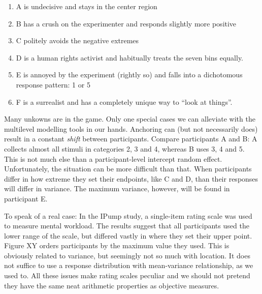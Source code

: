 \documentclass[]{svmono}
\providecommand{\tightlist}{%
  \setlength{\itemsep}{0pt}\setlength{\parskip}{0pt}}
\theoremstyle{definition}
\theoremstyle{definition}
\theoremstyle{definition}
\theoremstyle{remark}
\begin{document}
\begin{enumerate}
\def\labelenumi{\arabic{enumi}.}
\tightlist
\item
  A is undecisive and stays in the center region
\item
  B has a crush on the experimenter and responds slightly more positive
\item
  C politely avoids the negative extremes
\item
  D is a human rights activist and habitually treats the seven bins
  equally.
\item
  E is annoyed by the experiment (rightly so) and falls into a
  dichotomous response pattern: 1 or 5
\item
  F is a surrealist and has a completely unique way to ``look at
  things''.
\end{enumerate}

Many unkowns are in the game. Only one special cases we can alleviate
with the multilevel modelling tools in our hands. Anchoring can (but not
necessarily does) result in a constant \emph{shift} between
participants. Compare participants A and B: A collects almost all
stimuli in categories 2, 3 and 4, whereas B uses 3, 4 and 5. This is not
much else than a participant-level intercept random effect.
Unfortunately, the situation can be more difficult than that. When
participants differ in how extreme they set their endpoints, like C and
D, than their responses will differ in variance. The maximum variance,
however, will be found in participant E.

To speak of a real case: In the IPump study, a single-item rating scale
was used to measure mental workload. The results suggest that all
participants used the lower range of the scale, but differed vastly in
where they set their upper point. Figure XY orders participants by the
maximum value they used. This is obviously related to variance, but
seemingly not so much with location. It does not suffice to use a
response distribution with mean-variance relationship, as we used to.
All these issues make rating scales peculiar and we should not pretend
they have the same neat arithmetic properties as objective measures.
\end{document}
